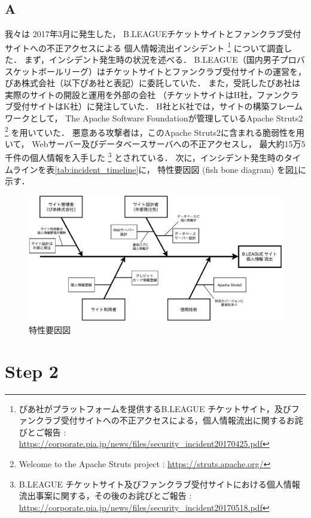 \documentclass[uplatex]{jsarticle}
\begin{document}
\subsection*{A}
我々は 2017年3月に発生した，
B.LEAGUEチケットサイトとファンクラブ受付サイトへの不正アクセスによる
個人情報流出インシデント
\footnote{
    ぴあ社がプラットフォームを提供するB.LEAGUE チケットサイト，及びファンクラブ受付サイトへの不正アクセスによる，個人情報流出に関するお詫びとご報告
    : \url{https://corporate.pia.jp/news/files/security_incident20170425.pdf}
}
について調査した．
まず，インシデント発生時の状況を述べる．
B.LEAGUE（国内男子プロバスケットボールリーグ）はチケットサイトとファンクラブ受付サイトの運営を，
ぴあ株式会社（以下ぴあ社と表記）に委託していた．
また，受託したぴあ社は実際のサイトの開設と運用を外部の会社
（チケットサイトはH社，ファンクラブ受付サイトはK社）に発注していた．
H社とK社では，サイトの構築フレームワークとして，
The Apache Software Foundationが管理しているApache Struts2
\footnote{
    Welcome to the Apache Struts project
    : \url{https://struts.apache.org/}
}
を用いていた．
悪意ある攻撃者は，このApache Struts2に含まれる脆弱性を用いて，
Webサーバー及びデータベースサーバへの不正アクセスし，
最大約15万5千件の個人情報を入手した
\footnote{
    B.LEAGUE チケットサイト及びファンクラブ受付サイトにおける個人情報流出事案に関する，その後のお詫びとご報告
    : \url{https://corporate.pia.jp/news/files/security_incident20170518.pdf}
}
とされている．
次に，インシデント発生時のタイムラインを表\ref{tab:incident_timeline}に，
特性要因図 (fish bone diagram) を図\ref{fig:fishbone}に示す．



\begin{figure}[htbp]
    \centering
    \includegraphics[width=0.8\linewidth]{pic/fishbone-GroupA.pdf}
    \caption{特性要因図}
    \label{fig:fishbone}
\end{figure}

\section*{Step 2}
\end{document}
